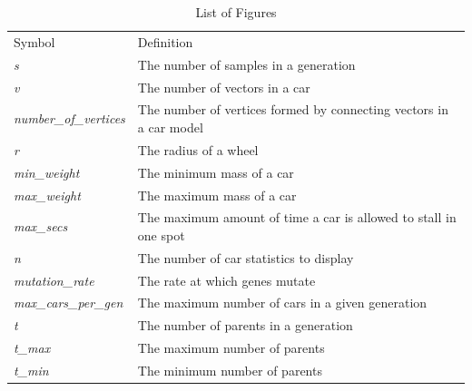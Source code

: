 \documentclass[12pt, titlepage]{article}
\begin{document}
\begin{table}[h!]
\centering
\label{LOF}
\begin{tabular}{ll}
Symbol & Definition \\
\textit{s} & The number of samples in a generation  \\
\textit{v} & The number of vectors in a car  \\
\textit{number\_of\_vertices} & The number of vertices formed by connecting 
vectors in a car model \\
\textit{r} & The radius of a wheel\\
\textit{min\_weight} & The minimum mass of a car\\
\textit{max\_weight} & The maximum mass of a car\\
\textit{max\_secs} & The maximum amount of time a car is allowed to stall in one 
spot\\
\textit{n} & The number of car statistics to display\\
\textit{mutation\_rate} & The rate at which genes mutate\\
\textit{max\_cars\_per\_gen} & The maximum number of cars in a given 
generation\\
\textit{t} & The number of parents in a generation\\
\textit{t\_max} & The maximum number of parents\\
\textit{t\_min} & The minimum number of parents\\
\end{tabular}
\caption{List of Figures}
\end{table}
\end{document}
